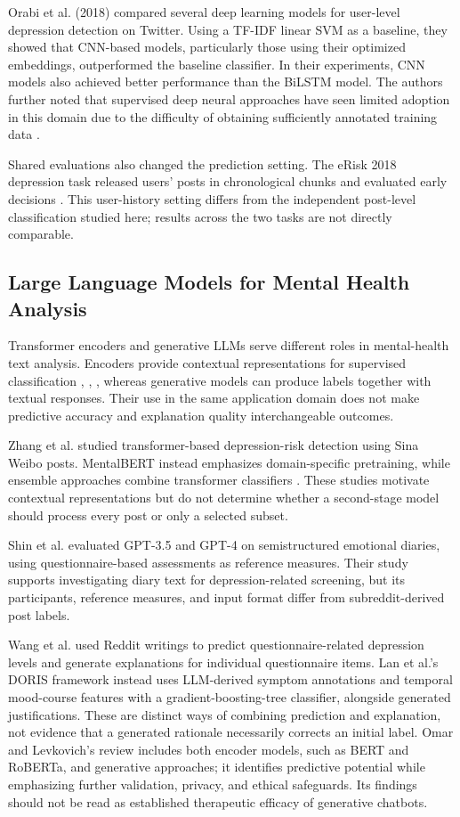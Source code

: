\documentclass{ieeeaccess}
\begin{document}
Orabi et al. (2018) \cite{ref30} compared several deep learning models for user-level depression detection on Twitter. Using a TF-IDF linear SVM as a baseline, they showed that CNN-based models, particularly those using their optimized embeddings, outperformed the baseline classifier. In their experiments, CNN models also achieved better performance than the BiLSTM model. The authors further noted that supervised deep neural approaches have seen limited adoption in this domain due to the difficulty of obtaining sufficiently annotated training data \cite{ref30}.

Shared evaluations also changed the prediction setting. The eRisk 2018 depression task released users' posts in chronological chunks and evaluated early decisions \cite{ref32}. This user-history setting differs from the independent post-level classification studied here; results across the two tasks are not directly comparable.

\subsection{Large Language Models for Mental Health Analysis}

Transformer encoders and generative LLMs serve different roles in mental-health text analysis. Encoders provide contextual representations for supervised classification \cite{ref8}, \cite{ref33}, \cite{ref34}, whereas generative models can produce labels together with textual responses. Their use in the same application domain does not make predictive accuracy and explanation quality interchangeable outcomes.

Zhang et al. \cite{ref33} studied transformer-based depression-risk detection using Sina Weibo posts. MentalBERT \cite{ref8} instead emphasizes domain-specific pretraining, while ensemble approaches combine transformer classifiers \cite{ref34}. These studies motivate contextual representations but do not determine whether a second-stage model should process every post or only a selected subset.

Shin et al. \cite{ref35} evaluated GPT-3.5 and GPT-4 on semistructured emotional diaries, using questionnaire-based assessments as reference measures. Their study supports investigating diary text for depression-related screening, but its participants, reference measures, and input format differ from subreddit-derived post labels.

Wang et al. \cite{ref43} used Reddit writings to predict questionnaire-related depression levels and generate explanations for individual questionnaire items. Lan et al.'s DORIS framework \cite{ref44} instead uses LLM-derived symptom annotations and temporal mood-course features with a gradient-boosting-tree classifier, alongside generated justifications. These are distinct ways of combining prediction and explanation, not evidence that a generated rationale necessarily corrects an initial label. Omar and Levkovich's review \cite{ref45} includes both encoder models, such as BERT and RoBERTa, and generative approaches; it identifies predictive potential while emphasizing further validation, privacy, and ethical safeguards. Its findings should not be read as established therapeutic efficacy of generative chatbots.
\end{document}
